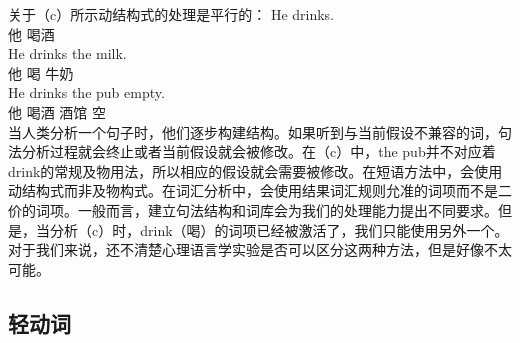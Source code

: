 \begin{exe}
\begin{xlist}[iv.]
\begin{exe}
\begin{xlist}[iv.]
关于（c）所示动结构式的处理是平行的：
\eal
\ex
\gll He drinks.\\
     他 喝酒\\
\ex
\gll He drinks the milk.\\
     他 喝  牛奶\\
\ex
\gll He drinks the pub empty.\\
     他 喝酒  酒馆 空\\
\zl
当人类分析一个句子时，他们逐步构建结构。如果听到与当前假设不兼容的词，句法分析过程就会终止或者当前假设就会被修改。在（c）中，the pub并不对应着drink的常规及物用法，所以相应的假设就会需要被修改。在短语方法中，会使用动结构式而非及物构式。在词汇分析中，会使用结果词汇规则允准的词项而不是二价的词项。一般而言，建立句法结构和词库会为我们的处理能力提出不同要求。但是，当分析（c）时，drink（喝）的词项已经被激活了，我们只能使用另外一个。对于我们来说，还不清楚心理语言学实验是否可以区分这两种方法，但是好像不太可能。

\subsection{轻动词}
\label{sec-psycho-lv}


\end{xlist}
\end{exe}
\end{xlist}
\end{exe}
